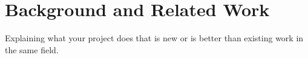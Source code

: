 \chapter{Background and Related Work}\label{ch:background} 

Explaining what your project does that is new or is better than existing work in the same field.

